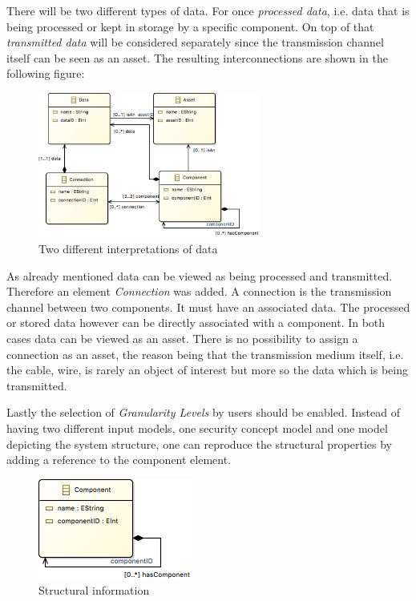 There will be two different types of data. For once \textit{processed data}, i.e. data that is being processed or kept in storage by a specific component. On top of that \textit{transmitted data} will be considered separately since the transmission channel itself can be seen as an asset. The resulting interconnections are shown in the following figure:

\begin{figure}[H]
\centering
\includegraphics[width=0.65\textwidth]{pictures/two_data.png}
\caption{Two different interpretations of data}
\label{fig:data}
\end{figure} 

As already mentioned data can be viewed as being processed and transmitted. Therefore an element \textit{Connection} was added. A connection is the transmission channel between two components. It must have an associated data. The processed or stored data however can be directly associated with a component. In both cases data can be viewed as an asset. There is no possibility to assign a connection as an asset, the reason being that the transmission medium itself, i.e. the cable, wire, is rarely an object of interest but more so the data which is being transmitted.

Lastly the selection of \textit{Granularity Levels} by users should be enabled. Instead of having two different input models, one security concept model and one model depicting the system structure, one can reproduce the structural properties by adding a reference to the component element.      

\begin{figure}[H]
\centering
\includegraphics[width=0.45\textwidth]{pictures/component_structure.png}
\caption{Structural information}
\label{fig:data}
\end{figure} 

